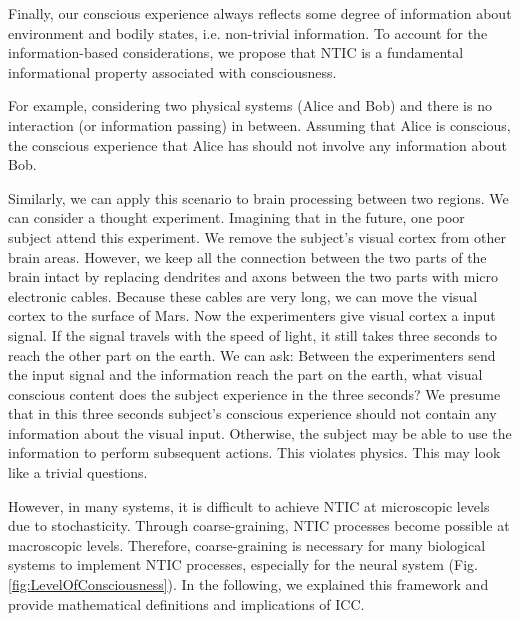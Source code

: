 \documentclass[utf8]{article}
\begin{document}
        Finally, our conscious experience always reflects some degree of information about environment and bodily states, i.e. non-trivial information. To account for the information-based considerations, we propose that NTIC is a fundamental informational property associated with consciousness. 
        
        
        
        \begin{WritingMaterials}
        For example, considering two physical systems (Alice and Bob) and there is no interaction (or information passing) in between. Assuming that Alice is conscious, the conscious experience that Alice has should not involve any information about Bob. 
        
        Similarly, we can apply this scenario to brain processing between two regions. We can consider a thought experiment. 
        Imagining that in the future, one poor subject attend this experiment. We remove the subject's visual cortex from other brain areas. However, we keep all the connection between the two parts of the brain intact by replacing dendrites and axons between the two parts with micro electronic cables. Because these cables are very long, we can move the visual cortex to the surface of Mars. Now the experimenters give visual cortex a input signal. If the signal travels with the speed of light, it still takes three seconds to reach the other part on the earth. We can ask: Between the experimenters send the input signal and the information reach the part on the earth, what visual conscious content does the subject experience in the three seconds? We presume that in this three seconds subject's conscious experience should not contain any information about the visual input. Otherwise, the subject may be able to use the information to perform subsequent actions. This violates physics. This may look like a trivial questions.
        

        However, in many systems, it is difficult to achieve NTIC at microscopic levels due to stochasticity. Through coarse-graining, NTIC processes become possible at macroscopic levels. Therefore, coarse-graining is necessary for many biological systems to implement NTIC processes, especially for the neural system (Fig. \ref{fig:LevelOfConsciousness}). In the following, we explained this framework and provide mathematical definitions and implications of ICC.  
        \end{WritingMaterials}
        
\end{document}
